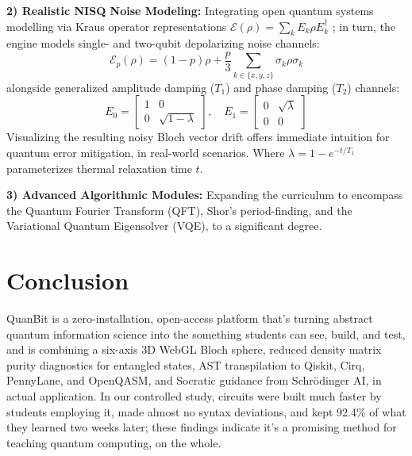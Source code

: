 \documentclass[conference]{IEEEtran}
\begin{document}
\noindent\textbf{2) Realistic NISQ Noise Modeling:} Integrating open quantum systems modelling via Kraus operator representations $\mathcal{E}(\rho) = \sum_k E_k \rho E_k^\dagger$ \cite{b29}; in turn, the engine models single- and two-qubit depolarizing noise channels:
\begin{equation}
\mathcal{E}_p(\rho) = (1 - p)\rho + \frac{p}{3} \sum_{k \in \{x,y,z\}} \sigma_k \rho \sigma_k
\end{equation}
alongside generalized amplitude damping ($T_1$) and phase damping ($T_2$) channels:
\begin{equation}
E_0 = \left[\begin{smallmatrix} 1 & 0 \\ 0 & \sqrt{1 - \lambda} \end{smallmatrix}\right], \quad
E_1 = \left[\begin{smallmatrix} 0 & \sqrt{\lambda} \\ 0 & 0 \end{smallmatrix}\right]
\end{equation}
Visualizing the resulting noisy Bloch vector drift offers immediate intuition for quantum error mitigation, in real-world scenarios. Where $\lambda = 1 - e^{-t/T_1}$ parameterizes thermal relaxation time $t$.

\noindent\textbf{3) Advanced Algorithmic Modules:} Expanding the curriculum to encompass the Quantum Fourier Transform (QFT), Shor's period-finding, and the Variational Quantum Eigensolver (VQE), to a significant degree.

\section{Conclusion}
\label{sec:conclusion}

QuanBit is a zero-installation, open-access platform that's turning abstract quantum information science into the something students can see, build, and test, and is combining a six-axis 3D WebGL Bloch sphere, reduced density matrix purity diagnostics for entangled states, AST transpilation to Qiskit, Cirq, PennyLane, and OpenQASM, and Socratic guidance from Schr{\"o}dinger AI, in actual application. In our controlled study, circuits were built much faster by students employing it, made almost no syntax deviations, and kept 92.4\% of what they learned two weeks later; these findings indicate it's a promising method for teaching quantum computing, on the whole.
\end{document}
